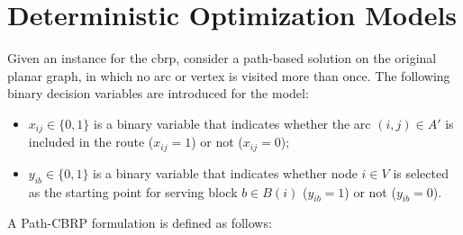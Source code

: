 \section{Deterministic Optimization Models}\label{sec:cbrp-deterministic-models}

Given an instance for the \gls{cbrp}, consider a path-based solution on the
original planar graph, in which no arc or vertex is visited more than once. The
following binary decision variables are introduced for the model:

\begin{itemize}
	\item $x_{ij} \in \{0, 1\}$ is a binary variable that indicates whether the arc $(i, j) \in A'$ is included in the route ($x_{ij} = 1$) or not ($x_{ij} = 0$);
	\item $y_{ib} \in \{0, 1\}$ is a binary variable that indicates whether node $i \in V$ is selected as the starting point for serving block $b \in B(i)$ ($y_{ib} = 1$) or not ($y_{ib} = 0$).
\end{itemize}

A Path-CBRP formulation is defined as follows:
\allowdisplaybreaks

